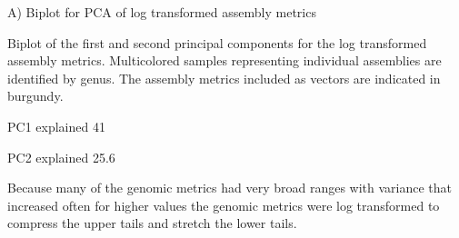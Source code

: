       A) Biplot for PCA of log transformed assembly metrics

Biplot of the first and second principal components for the log transformed assembly metrics. Multicolored samples representing individual assemblies are identified by genus. The assembly metrics included as vectors are indicated in burgundy. 

PC1 explained 41%

PC2 explained 25.6%

Because many of the genomic metrics had very broad ranges with variance that increased often for higher values the genomic metrics were log transformed to compress the upper tails and stretch the lower tails.
